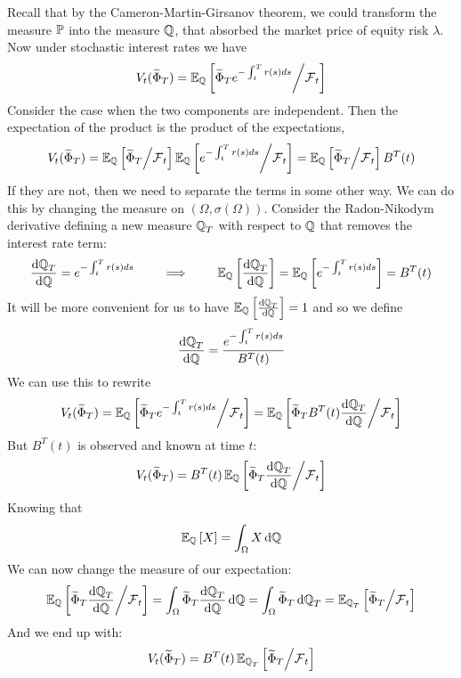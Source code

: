 \documentclass[11pt]{article}
\begin{document}
Recall that by the Cameron-Martin-Girsanov theorem, we could transform the measure $\operatorname{\mathbb P}$ into the measure $\operatorname{\mathbb Q}$, that absorbed the market price of equity risk $\lambda$. \\

Now under stochastic interest rates we have
$$ V_t(\widetilde{\Phi}_T) = \operatorname{\mathbb E}_{\operatorname{\mathbb Q}} \left[ \widetilde{\Phi}_T e^{-\int_t^T r(s) ds} \middle/ \operatorname{\mathcal F}_t \right]$$
Consider the case when the two components are independent. Then the expectation of the product is the product of the expectations,
$$ V_t(\widetilde{\Phi}_T) = \operatorname{\mathbb E}_{\operatorname{\mathbb Q}} \left[ \widetilde{\Phi}_T \middle/ \operatorname{\mathcal F}_t \right] \operatorname{\mathbb E}_{\operatorname{\mathbb Q}} \left[ e^{-\int_t^T r(s) ds} \middle/ \operatorname{\mathcal F}_t \right] = \operatorname{\mathbb E}_{\operatorname{\mathbb Q}} \left[ \widetilde{\Phi}_T \middle/ \operatorname{\mathcal F}_t \right] B^T(t)$$
If they are not, then we need to separate the terms in some other way. We can do this by changing the measure on $\left(\Omega, \sigma(\Omega)\right)$. Consider the Radon-Nikodym derivative defining a new measure $\operatorname{\mathbb Q}_T$ with respect to $\operatorname{\mathbb Q}$ that removes the interest rate term:
$$\frac{\dif \Qmeas_T}{\dif \Qmeas} = e^{-\int_t^T r(s) ds} \qquad \implies \qquad \Exp_{\Qmeas} \left[ \frac{\dif \Qmeas_T}{\dif \Qmeas} \right]  = \Exp_{\Qmeas} \left[ e^{-\int_t^T r(s) ds} \right] = B^T(t)$$
It will be more convenient for us to have $\Exp_{\Qmeas} \left[ \frac{\dif \Qmeas_T}{\dif \Qmeas} \right] = 1$ and so we define 
$$\frac{\dif \Qmeas_T}{\dif \Qmeas} = \frac{e^{-\int_t^T r(s) ds}}{B^T(t)}$$
We can use this to rewrite
$$ V_t(\widetilde{\Phi}_T) = \Exp_{\Qmeas} \left[ \widetilde{\Phi}_T e^{-\int_t^T r(s) ds} \middle/ \Filtr_t \right] = \Exp_{\Qmeas} \left[ \widetilde{\Phi}_T B^T(t) \frac{\dif \Qmeas_T}{\dif \Qmeas} \middle/ \Filtr_t \right]$$
But $B^T(t)$ is observed and known at time $t$:
$$ V_t(\widetilde{\Phi}_T) = B^T(t) \Exp_{\Qmeas} \left[ \widetilde{\Phi}_T \frac{\dif \Qmeas_T}{\dif \Qmeas} \middle/ \Filtr_t \right]$$
Knowing that 
$$\Exp_{\Qmeas}\left[X\right] = \int_\Omega X \dif \Qmeas$$
We can now change the measure of our expectation:
$$ \Exp_{\Qmeas} \left[ \widetilde{\Phi}_T \frac{\dif \Qmeas_T}{\dif \Qmeas} \middle/ \Filtr_t \right] 
= \int_\Omega \widetilde{\Phi}_T \frac{\dif \Qmeas_T}{\dif \Qmeas} \dif \Qmeas 
= \int_\Omega \widetilde{\Phi}_T \dif \Qmeas_T 
= \Exp_{\Qmeas_T} \left[ \widetilde{\Phi}_T \middle/ \Filtr_t \right]$$
And we end up with:
$$ V_t(\widetilde{\Phi}_T) = B^T(t) \operatorname{\mathbb E}_{\operatorname{\mathbb Q}_T} \left[ \widetilde{\Phi}_T \middle/ \operatorname{\mathcal F}_t \right]$$\\
\end{document}

